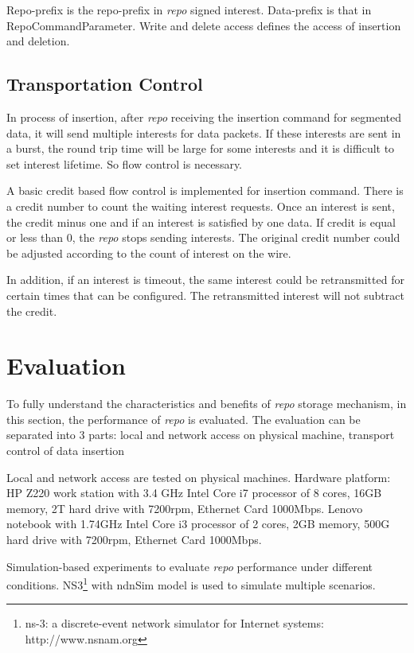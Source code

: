 \documentclass[conference]{IEEEtran}
\begin{document}
Repo-prefix is the repo-prefix in \emph{repo} signed interest. Data-prefix is that in RepoCommandParameter. Write and delete access defines the access of insertion and deletion.

\subsection{Transportation Control}
In process of insertion, after \emph{repo} receiving the insertion command for segmented data, it will send multiple interests for data packets. If these interests are sent in a burst, the round trip time will be large for some interests and it is difficult to set interest lifetime. So flow control is necessary.

A basic credit based flow control is implemented for insertion command. There is a credit number to count the waiting interest requests. Once an interest is sent, the credit minus one and if an interest is satisfied by one data. If credit is equal or less than 0, the \emph{repo} stops sending interests. The original credit number could be adjusted according to the count of interest on the wire.

In addition, if an interest is timeout, the same interest could be retransmitted for certain times that can be configured. The retransmitted interest will not subtract the credit.

\section{Evaluation} \label{section-evaluation}

To fully understand the characteristics and benefits of \emph{repo} storage mechanism, in this section, the performance of \emph{repo} is evaluated. The evaluation can be separated into 3 parts: local and network access on physical machine, transport control of data insertion

Local and network access are tested on physical machines. Hardware platform: HP Z220 work station with 3.4 GHz Intel Core i7 processor of 8 cores, 16GB memory, 2T hard drive with 7200rpm, Ethernet Card 1000Mbps.  Lenovo notebook with 1.74GHz Intel Core i3 processor of 2 cores, 2GB memory, 500G hard drive with 7200rpm, Ethernet Card 1000Mbps.

Simulation-based experiments to evaluate \emph{repo} performance under different conditions. NS3\footnote{ns-3: a discrete-event network simulator for Internet systems:
http://www.nsnam.org} with ndnSim \cite{afanasyev2012ndnsim} model is used to simulate multiple scenarios.
\end{document}
